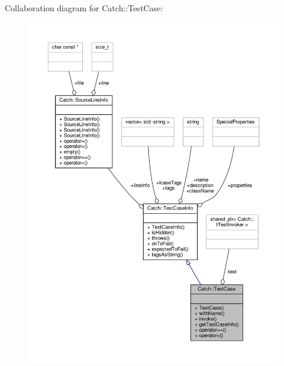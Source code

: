 Collaboration diagram for Catch\-:\-:Test\-Case\-:
\nopagebreak
\begin{figure}[H]
\begin{center}
\leavevmode
\includegraphics[width=350pt]{class_catch_1_1_test_case__coll__graph}
\end{center}
\end{figure}
